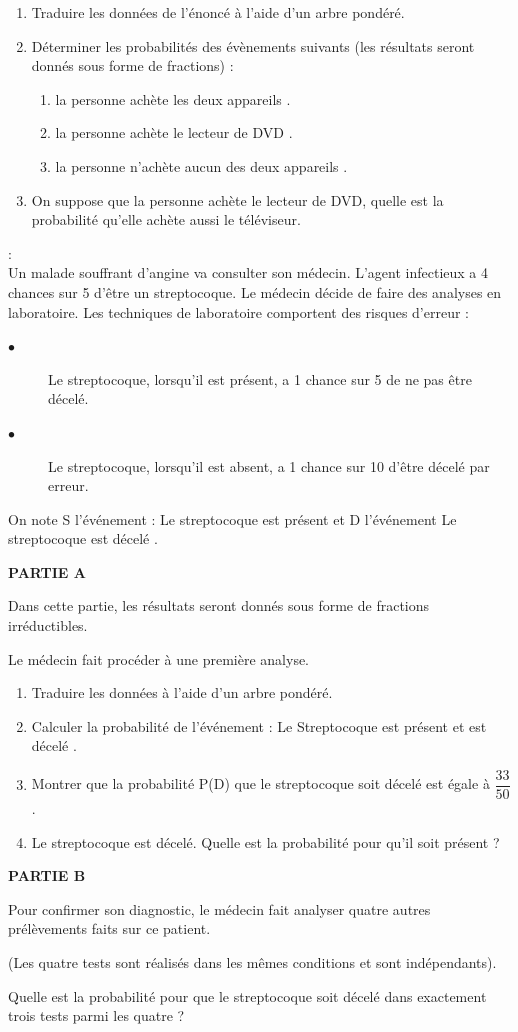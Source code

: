 \begin{enumerate}
\item Traduire les données de l'énoncé à l'aide d'un arbre pondéré.
\item Déterminer les probabilités des évènements suivants (les résultats seront donnés sous forme de fractions) :
\begin{enumerate}
\item \og la personne achète les deux appareils \fg .
\item \og la personne achète le lecteur de DVD \fg .
\item \og la personne n'achète aucun des deux appareils \fg . 
\end{enumerate}
\item On suppose que la personne achète le lecteur de DVD, quelle est la probabilité qu'elle achète aussi le téléviseur.
\end{enumerate}

\exo : \\
Un malade souffrant d'angine va consulter son médecin. L'agent infectieux a 4 chances sur 5 d'être un streptocoque. Le médecin décide de faire des analyses en laboratoire. Les techniques de laboratoire comportent des risques d'erreur :
\begin{description}
\item[$\bullet$] Le streptocoque, lorsqu'il est présent, a 1 chance sur 5 de ne pas être décelé.
\item[$\bullet$] Le streptocoque, lorsqu'il est absent, a 1 chance sur 10 d'être décelé par erreur.

\end{description}

On note S  l'événement : \og Le streptocoque est présent \fg et  D l'événement  \og Le streptocoque est décelé \fg .

{\bf PARTIE A}

Dans cette partie, les résultats seront donnés sous forme de fractions irréductibles.

Le médecin fait procéder à une première analyse.
\begin{enumerate}
\item Traduire les données à l'aide d'un arbre pondéré.
\item Calculer la probabilité de l'événement : \og Le Streptocoque est présent et est décelé \fg .
\item Montrer que la probabilité P(D) que le streptocoque soit décelé est égale à $\dfrac{33}{50}$.
\item Le streptocoque est décelé. Quelle est la probabilité pour qu'il soit présent ?
\end{enumerate}

{\bf PARTIE B}

Pour confirmer son diagnostic, le médecin fait analyser quatre autres prélèvements faits sur ce patient.

(Les quatre tests sont réalisés dans les mêmes conditions et sont indépendants).

Quelle est la probabilité pour que le streptocoque soit décelé dans exactement trois tests parmi les quatre ?

